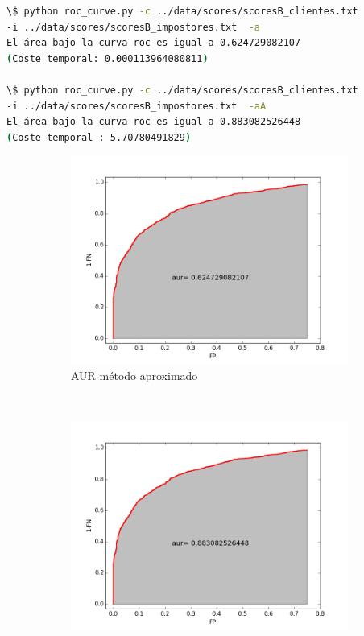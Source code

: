 \begin{lstlisting}[language=bash,label=roc:aur,caption=Calculo del área bajo la curva ROC para sistemas biométricos]
\$ python roc_curve.py -c ../data/scores/scoresB_clientes.txt 
-i ../data/scores/scoresB_impostores.txt  -a       
El área bajo la curva roc es igual a 0.624729082107 
(Coste temporal: 0.000113964080811)

\$ python roc_curve.py -c ../data/scores/scoresB_clientes.txt 
-i ../data/scores/scoresB_impostores.txt  -aA
El área bajo la curva roc es igual a 0.883082526448 
(Coste temporal : 5.70780491829)
\end{lstlisting}

\begin{figure}[ht]
    \centering
        \begin{subfigure}[b]{0.5\textwidth}
                \centering
                \includegraphics[scale=0.4]{../roc/outputs/aurB_metodo1.png}
                \caption{AUR método aproximado}
                \label{fig:aurAprox}
        \end{subfigure}%
        ~ 
        \begin{subfigure}[b]{0.5\textwidth}
                \centering
                \includegraphics[scale=0.4]{../roc/outputs/aurB_metodo2.png}

\end{subfigure}
\end{figure}
